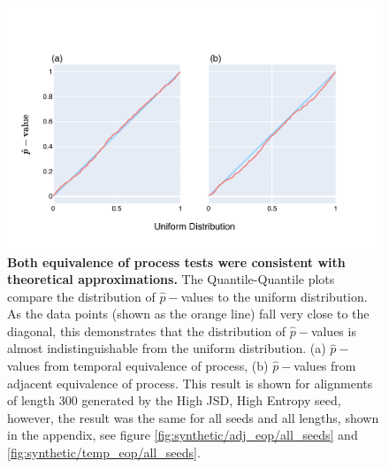 \begin{figure}[!htb]
\centering
\includegraphics[width=\textwidth]{figures/plots/synthetic/adj-temp_eop/High JSD, High Entropy.pdf}
\caption{\textbf{Both equivalence of process tests were consistent with theoretical approximations.} The Quantile-Quantile plots compare the distribution of $\hat p-$values to the uniform distribution. As the data points (shown as the orange line) fall very close to the diagonal, this demonstrates that the distribution of $\hat p-$values is almost indistinguishable from the uniform distribution. (a) $\hat p-$values from temporal equivalence of process, (b) $\hat p-$values from adjacent equivalence of process. This result is shown for alignments of length 300 generated by the High JSD, High Entropy seed, however, the result was the same for all seeds and all lengths, shown in the appendix, see figure \ref{fig:synthetic/adj_eop/all_seeds} and \ref{fig:synthetic/temp_eop/all_seeds}.}
\label{fig:synthetic/adj-temp_eop/HighJSDHighEntropy}
\end{figure}